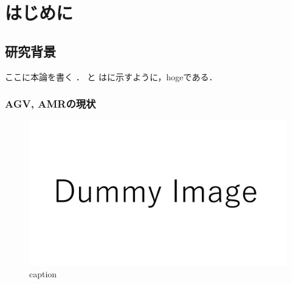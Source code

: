 \documentclass[main]{subfiles}
\begin{document}
\chapter{はじめに}
\section{研究背景}
ここに本論を書く \cite{ref:yao2017integrated} \cite{ref:ugarte1992curling} \cite{ref:nomura2022uwb}．
と はに示すように，hogeである．

\subsection{AGV, AMRの現状}

\begin{figure}[htbp]
    \centering
    \includegraphics[keepaspectratio, width=\linewidth]{figures/dummy.pdf}
    \caption{caption}
    \label{fig:label}
\end{figure}
\end{document}
